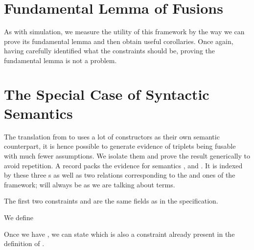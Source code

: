 
\section{Fundamental Lemma of Fusions}

As with simulation, we measure the utility of this framework by the way we can
prove its fundamental lemma and then obtain useful corollaries. Once again,
having carefully identified what the constraints should be, proving the fundamental
lemma is not a problem.


\section{The Special Case of Syntactic Semantics}

The translation from  to  uses a lot of constructors
as their own semantic counterpart, it is hence possible to generate evidence of
 triplets being fusable with much fewer assumptions. We isolate
them and prove the result generically to avoid repetition. A 
record packs the evidence for  semantics ,  and
. It is indexed by these three s as well as two relations
corresponding to the  and  ones of the  framework;
 will always be  as we are talking about terms.


The first two constraints  and  are the same
fields as in the  specification.


We define 


Once we have , we can state  which is also a constraint
already present in the definition of .


